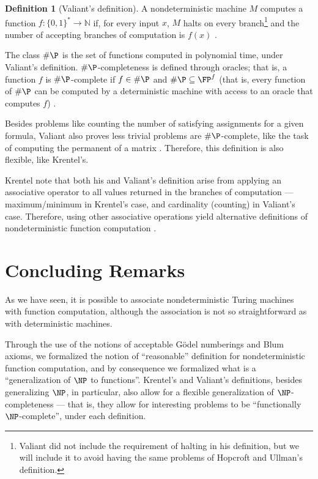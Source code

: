 \documentclass[12pt]{article}
\theoremstyle{definition}
\newtheorem{definition}{Definition}
\begin{document}
\begin{definition}[Valiant's definition]
    A nondeterministic machine $M$ computes a function $f: \{0, 1\}^* \to \mathbb N$ if,
    for every input $x$,
    $M$ halts on every branch\footnote{
        Valiant did not include the requirement of halting in his definition,
        but we will include it to avoid having the same problems
        of Hopcroft and Ullman's definition.
    }
    and the number of accepting branches of computation is $f(x)$
    \cite[p.~191]{Valiant1979}.
\end{definition}

The class $\#\P$ is the set of functions computed in polynomial time,
under Valiant's definition.
$\#\P$-completeness is defined through oracles;
that is, a function $f$ is $\#\P$-complete if $f \in \#\P$
and $\#\P \subseteq \FP^f$
(that is, every function of $\#\P$ can be computed by a deterministic machine
with access to an oracle that computes $f$)
\cite[p.~191]{Valiant1979}.

Besides problems like counting the number of satisfying assignments
for a given formula,
Valiant also proves less trivial problems are $\#\P$-complete,
like the task of computing the permanent of a matrix
\cite[p.~194]{Valiant1979}.
Therefore,
this definition is also flexible, like Krentel's.

Krentel note that both his and Valiant's definition
arise from applying an associative operator
to all values returned in the branches of computation
--- maximum/minimum in Krentel's case,
and cardinality (counting) in Valiant's case.
Therefore, using other associative operations yield alternative definitions
of nondeterministic function computation \cite[p.~493]{Krentel1988}.

\section{Concluding Remarks}
\label{sec:conclusion}

As we have seen,
it is possible to associate nondeterministic Turing machines
with function computation,
although the association is not so straightforward as with deterministic machines.

Through the use of the notions of acceptable Gödel numberings
and Blum axioms,
we formalized the notion of ``reasonable'' definition
for nondeterministic function computation,
and by consequence we formalized what is a ``generalization of $\NP$ to functions''.
Krentel's and Valiant's definitions,
besides generalizing $\NP$, in particular,
also allow for a flexible generalization of $\NP$-completeness
--- that is, they allow for interesting problems to be ``functionally $\NP$-complete'',
under each definition.
\end{document}
